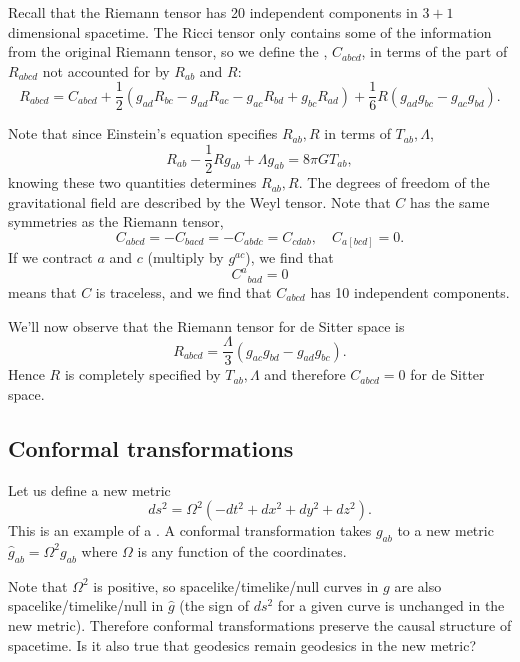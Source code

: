 \begin{defn}
Recall that the Riemann tensor has 20 independent components in $3+1$ dimensional spacetime. The Ricci tensor only contains some of the information from the original Riemann tensor, so we define the , $C_{abcd}$, in terms of the part of $R_{abcd}$ not accounted for by $R_{ab}$ and $R$:
$$R_{abcd}=C_{abcd}+\frac{1}{2}(g_{ad}R_{bc}-g_{ad}R_{ac}-g_{ac}R_{bd}+g_{bc}R_{ad})+\frac{1}{6}R(g_{ad}g_{bc}-g_{ac}g_{bd}).$$
\end{defn}
Note that since Einstein's equation specifies $R_{ab},R$ in terms of $T_{ab},\Lambda$,
$$R_{ab}-\frac{1}{2}Rg_{ab}+\Lambda g_{ab}=8\pi G T_{ab},$$
knowing these two quantities determines $R_{ab},R$. The degrees of freedom of the gravitational field are described by the Weyl tensor. Note that $C$ has the same symmetries as the Riemann tensor,
$$C_{abcd}=-C_{bacd}=-C_{abdc}=C_{cdab},\quad C_{a[bcd]}=0.$$
If we contract $a$ and $c$ (multiply by $g^{ac}$), we find that
$${C^a}_{bad}=0$$ means that $C$ is traceless, and we find that $C_{abcd}$ has 10 independent components.

We'll now observe that the Riemann tensor for de Sitter space is
$$R_{abcd}=\frac{\Lambda}{3}(g_{ac}g_{bd}-g_{ad}g_{bc}).$$
Hence $R$ is completely specified by $T_{ab},\Lambda$ and therefore $C_{abcd}=0$ for de Sitter space.

\subsection*{Conformal transformations} Let us define a new metric
$$ds^2=\Omega^2(-dt^2+dx^2+dy^2+dz^2).$$
This is an example of a . A conformal transformation takes $g_{ab}$ to a new metric $\hat g_{ab}=\Omega^2 g_{ab}$ where $\Omega$ is any function of the coordinates.

Note that $\Omega^2$ is positive, so spacelike/timelike/null curves in $g$ are also spacelike/timelike/null in $\hat g$ (the sign of $ds^2$ for a given curve is unchanged in the new metric). Therefore conformal transformations preserve the causal structure of spacetime. Is it also true that geodesics remain geodesics in the new metric?

